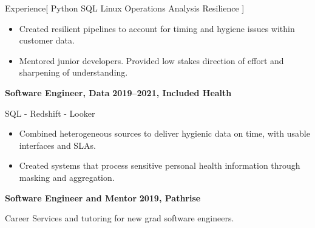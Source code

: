 \documentclass[11pt,a4paper]{article}
\begin{document}
\begin{mysection}{Experience}[
    Python
    \textbullet{} SQL
    \textbullet{} Linux
    \textbullet{} Operations
    \textbullet{} Analysis
    \textbullet{} Resilience
]
\begin{addmargin}[0.5em]{0em}
\begin{adjustwidth}{1ex}{0ex}
      \begin{itemize}
        [label=-, topsep=0pt, itemsep=0.5ex, parsep=0pt, leftmargin=1em]
      \item Created resilient pipelines to account for timing and hygiene issues
            within customer data.
      \item Mentored junior developers.  Provided low stakes direction of effort
            and sharpening of understanding.
      \end{itemize}
    \end{adjustwidth}
  \end{addmargin}
  \medskip


  \begin{addmargin}[0.5em]{0em}
    {\large\bfseries Software Engineer, Data}%
    \hfill {\bfseries 2019--2021, Included Health}%
      \begin{adjustwidth}{1ex}{0ex}
      SQL - Redshift - Looker

      \begin{itemize}
        [label=-, topsep=0pt, itemsep=0.5ex, parsep=0pt, leftmargin=1em]
      \item Combined heterogeneous sources to deliver hygienic data on time,
          with usable interfaces and SLAs.
      \item Created systems that process sensitive personal health information
            through masking and aggregation.
      \end{itemize}
      \end{adjustwidth}
    \end{addmargin}
    \medskip


    \begin{addmargin}[0.5em]{0em}
    {\large\bfseries Software Engineer and Mentor}
    \hfill {\bfseries 2019, Pathrise}%
      \begin{adjustwidth}{1ex}{0ex}
      \hspace*{0ex}Career Services and tutoring for new grad software engineers.
      \end{adjustwidth}


\end{addmargin}
\end{mysection}
\end{document}
